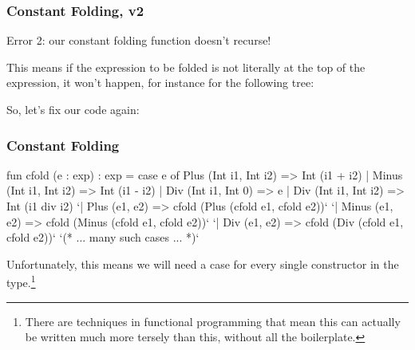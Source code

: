 \documentclass[aspectratio=169]{beamer}
\begin{document}
\begin{frame}[fragile]
  \frametitle{Constant Folding, v2}

  Error 2: our constant folding function doesn't recurse!

  \pause
  \vspace{\fill}

  This means if the expression to be folded is not literally at the top
  of the expression, it won't happen, for instance for the following tree:

  \begin{center}
  \end{center}

  \pause
  \vspace{\fill}

  So, let's fix our code again:
\end{frame}

\begin{frame}[fragile]
  \frametitle{Constant Folding}

  {\small
  \begin{codeblock}
    fun cfold (e : exp) : exp =
      case e of
        Plus  (Int i1, Int i2) => Int (i1 + i2)
      | Minus (Int i1, Int i2) => Int (i1 - i2)
      | Div   (Int i1, Int 0)  => e
      | Div   (Int i1, Int i2) => Int (i1 div i2)
      `| Plus  (e1, e2) => cfold (Plus  (cfold e1, cfold e2))`
      `| Minus (e1, e2) => cfold (Minus (cfold e1, cfold e2))`
      `| Div   (e1, e2) => cfold (Div   (cfold e1, cfold e2))`
      `(* ... many such cases ... *)`
  \end{codeblock}
  }

  \pause
  \vspace{\fill}

  Unfortunately, this means we will need a case for every single
  constructor in the  type.\footnote<2->{There are techniques in
  functional programming that mean this can actually be written much more
  tersely than this, without all the boilerplate.}
\end{frame}
\end{document}
